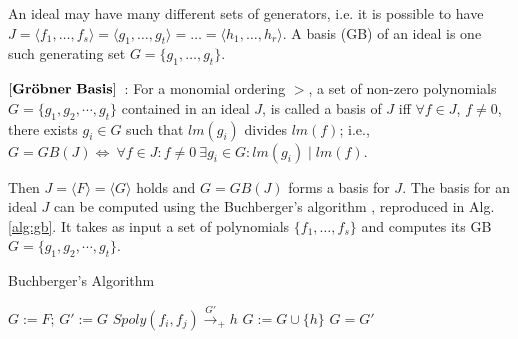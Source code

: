 An ideal may have many different sets of generators, i.e. it is
possible to have $J = \langle f_1, \dots, f_s\rangle = \langle g_1,
\dots, g_t \rangle = \dots = \langle h_1,\dots, h_r\rangle$. A
\Grobner basis (GB) of an ideal is one such generating set
$G=\{g_1, \dots, g_t\}$.

\begin{Definition}
\label{def:gb}
$\bf{\left[Gr\ddot{o}bner\ Basis\right]}$~\cite{gb_book}: 
For a monomial ordering $>$, a set  of non-zero polynomials $G =
\{g_1,g_2,\cdots,g_t\}$ contained in an ideal $J$, is called a
\Grobner basis of $J$ iff 
$\forall f \in J$, $f\neq 0$, there exists $g_i\in G$ 
such that $lm(g_i)$ divides $lm(f)$; i.e., $G = GB(J)
\Leftrightarrow\  \forall f \in J : f \neq 0 \ \exists g_i \in G :
lm(g_i)\mid lm(f)$.  
\end{Definition}

Then $J = \langle F \rangle = \langle G \rangle$ holds and $G=GB(J)$
forms a basis for $J$. The \Grobner basis for an ideal $J$ can be
computed using the  Buchberger's algorithm \cite{buchberger_thesis},
reproduced in Alg. \ref{alg:gb}. 
It takes as input a set of polynomials $\{f_1,\dots, f_s\}$ and
computes its GB $G = \{g_1,g_2,\cdots,g_t\}$. 
\vspace{0.1in}
\begin{algorithm}
\caption {Buchberger's Algorithm}
\label{alg:gb}
\begin{algorithmic}[1]
  \State $G:= F$;
  \Repeat
    \State $G' := G$
      \State $Spoly(f_i, f_j) \stackrel{G'}{\textstyle\longrightarrow}_+h$ 
       \State $G:= G \cup \{h\}$ \EndIf
    \EndFor
  \Until $G = G'$
\end{algorithmic}
\end{algorithm}


